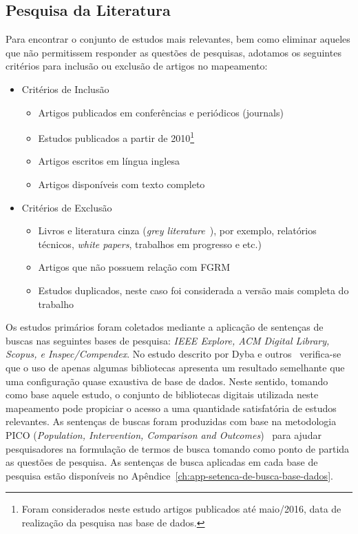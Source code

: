 \subsection{Pesquisa da Literatura}
\label{subsec:map-pesquisa-literatura}

Para encontrar o conjunto de estudos mais relevantes, bem como eliminar aqueles
que não permitissem responder as questões de pesquisas, adotamos os seguintes
critérios para inclusão ou exclusão de artigos no mapeamento:

\begin{itemize}
	\item Critérios de Inclusão
		\begin{itemize}
			\item Artigos
				publicados em conferências e periódicos (journals)
			\item Estudos
				publicados a partir de 2010\footnote{Foram considerados neste
					estudo artigos publicados até maio/2016, data de realização
					da pesquisa nas base de dados.}
			\item Artigos escritos em
				língua inglesa
			\item Artigos disponíveis com texto
				completo
		\end{itemize}
	\item Critérios de Exclusão
		\begin{itemize}
            \item Livros e literatura cinza (\textit{grey
                  literature}~\cite{keele2007guidelines}), por exemplo,
                  relatórios técnicos, \textit{white papers}, trabalhos em
                  progresso e etc.)
             \item Artigos que não possuem relação com FGRM
			\item Estudos duplicados, neste caso foi considerada a versão mais
				completa do trabalho
		\end{itemize}
\end{itemize}

Os estudos primários foram coletados mediante a aplicação de sentenças de
buscas nas seguintes bases de pesquisa: \textit{IEEE Explore, ACM Digital
    Library, Scopus, e Inspec/Compendex}. No estudo descrito por Dyba e
outros~\cite{dybaa2007applying} verifica-se que o uso de apenas algumas
bibliotecas apresenta um resultado semelhante que uma configuração quase
exaustiva de base de dados. Neste sentido, tomando como base aquele estudo, o
conjunto de bibliotecas digitais utilizada neste mapeamento pode propiciar o
acesso a uma quantidade satisfatória de estudos relevantes. As sentenças de
buscas foram produzidas com base na metodologia PICO (\textit{Population,
    Intervention, Comparison and Outcomes})~\cite{keele2007guidelines} para
ajudar pesquisadores na formulação de termos de busca tomando como ponto de
partida as questões de pesquisa. As sentenças de busca aplicadas em cada base
de pesquisa estão disponíveis no
Apêndice~\ref{ch:app-setenca-de-busca-base-dados}.

